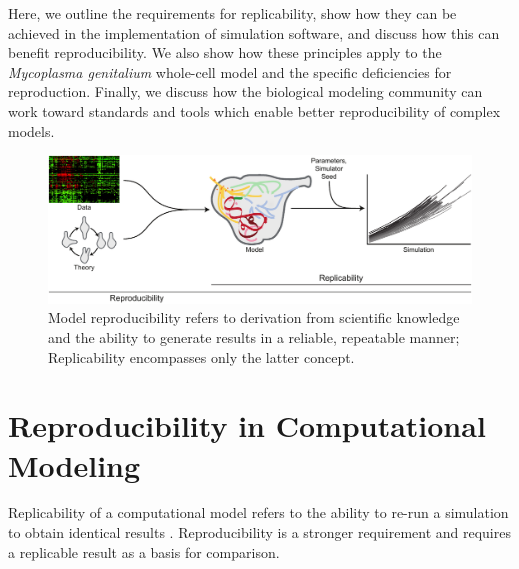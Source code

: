 \documentclass[journal,transmag,twoside]{IEEEtran}
\begin{document}

Here, we outline the requirements for replicability, show how they can
be achieved in the implementation of simulation software, and discuss how this can benefit
reproducibility. We also show how these principles apply to the \textit{Mycoplasma genitalium} whole-cell
model \cite{Karr2012} and the specific deficiencies for reproduction.
Finally, we discuss how the biological modeling community can work toward standards
and tools which enable better reproducibility of complex models.

\begin{figure}[!t]
\centering
\includegraphics[width=\textwidth]{figure1/figure1}
\caption{Model reproducibility refers to derivation from scientific knowledge and the
ability to generate results in a reliable, repeatable manner; Replicability encompasses only the latter concept.}
\label{fig_repro_diagram}
\end{figure}

\section{Reproducibility in Computational Modeling}

Replicability of a computational model refers to the ability to
re-run a simulation to obtain identical results \cite{easterbrook2014open}.
Reproducibility is a stronger requirement and requires a replicable result as a basis for comparison.
\end{document}
